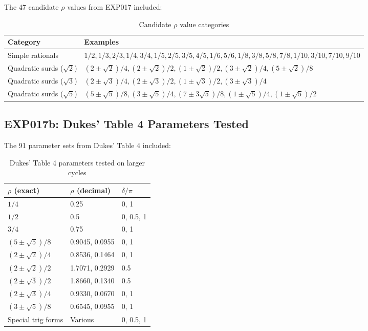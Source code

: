 \documentclass[12pt]{article}
\begin{document}
The 47 candidate $\rho$ values from EXP017 included:

\begin{table}[H]
\centering
\caption{Candidate $\rho$ value categories}
\label{tab:candidates}
\begin{tabular}{ll}
\toprule
\textbf{Category} & \textbf{Examples} \\
\midrule
Simple rationals & $1/2, 1/3, 2/3, 1/4, 3/4, 1/5, 2/5, 3/5, 4/5, 1/6, 5/6, 1/8, 3/8, 5/8, 7/8, 1/10, 3/10, 7/10, 9/10$ \\
Quadratic surds ($\sqrt{2}$) & $(2\pm\sqrt{2})/4, (2\pm\sqrt{2})/2, (1\pm\sqrt{2})/2, (3\pm\sqrt{2})/4, (5\pm\sqrt{2})/8$ \\
Quadratic surds ($\sqrt{3}$) & $(2\pm\sqrt{3})/4, (2\pm\sqrt{3})/2, (1\pm\sqrt{3})/2, (3\pm\sqrt{3})/4$ \\
Quadratic surds ($\sqrt{5}$) & $(5\pm\sqrt{5})/8, (3\pm\sqrt{5})/4, (7\pm3\sqrt{5})/8, (1\pm\sqrt{5})/4, (1\pm\sqrt{5})/2$ \\
\bottomrule
\end{tabular}
\end{table}

\subsection{EXP017b: Dukes' Table 4 Parameters Tested}

The 91 parameter sets from Dukes' Table 4 included:

\begin{table}[H]
\centering
\caption{Dukes' Table 4 parameters tested on larger cycles}
\label{tab:dukes_params}
\begin{tabular}{lll}
\toprule
$\rho$ (exact) & $\rho$ (decimal) & $\delta/\pi$ \\
\midrule
$1/4$ & 0.25 & 0, 1 \\
$1/2$ & 0.5 & 0, 0.5, 1 \\
$3/4$ & 0.75 & 0, 1 \\
$(5\pm\sqrt{5})/8$ & 0.9045, 0.0955 & 0, 1 \\
$(2\pm\sqrt{2})/4$ & 0.8536, 0.1464 & 0, 1 \\
$(2\pm\sqrt{2})/2$ & 1.7071, 0.2929 & 0.5 \\
$(2\pm\sqrt{3})/2$ & 1.8660, 0.1340 & 0.5 \\
$(2\pm\sqrt{3})/4$ & 0.9330, 0.0670 & 0, 1 \\
$(3\pm\sqrt{5})/8$ & 0.6545, 0.0955 & 0, 1 \\
Special trig forms & Various & 0, 0.5, 1 \\
\bottomrule
\end{tabular}
\end{table}
\end{document}
